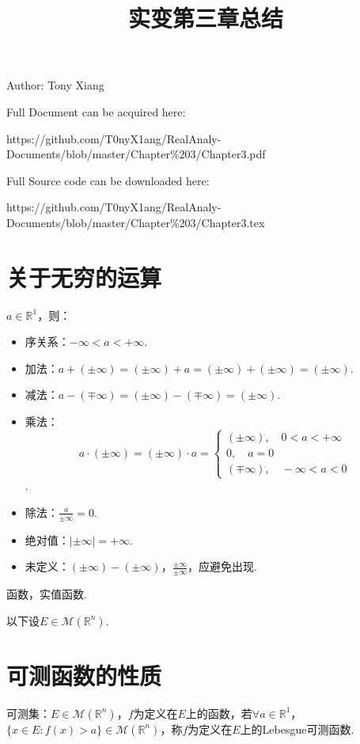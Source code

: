 \documentclass[bwprint, withoutpreface]{cumcmthesis}
\title{实变第三章总结}
\begin{document}
\maketitle
\noindent Author: Tony Xiang

\noindent Full Document can be acquired here: 

\noindent https://github.com/T0nyX1ang/RealAnaly-Documents/blob/master/Chapter\%203/Chapter3.pdf

\noindent Full Source code can be downloaded here:

\noindent https://github.com/T0nyX1ang/RealAnaly-Documents/blob/master/Chapter\%203/Chapter3.tex

\section{关于无穷的运算}
\indent $a \in \mathbb{R}^1$，则：
\begin{itemize}[itemindent=2em]
	\item 序关系：$-\infty < a < +\infty$.
	\item 加法：$a + (\pm{\infty}) = (\pm{\infty}) + a = (\pm{\infty}) + (\pm{\infty}) = (\pm{\infty})$.
	\item 减法：$a - (\mp{\infty}) = (\pm{\infty}) - (\mp{\infty}) = (\pm{\infty})$.
	\item 乘法：
	\begin{equation*}
	a \cdot (\pm{\infty}) = (\pm{\infty}) \cdot a = 
	\begin{cases}
		(\pm{\infty}), \quad 0 < a < +\infty \\
		0, \quad a = 0 \\
		(\mp{\infty}), \quad -\infty < a < 0
	\end{cases}	
	\end{equation*}.
	\item 除法：$\frac{a}{\pm{\infty}} = 0$.
	\item 绝对值：$|\pm{\infty}| = +\infty$.
	\item 未定义：$(\pm{\infty}) - (\pm{\infty})$，$\frac{\pm{\infty}}{\pm{\infty}}$，应避免出现.
\end{itemize}

函数，实值函数.

以下设$E \in \mathcal{M}(\mathbb{R}^n)$.

\section{可测函数的性质}
\indent 可测集：$E \in \mathcal{M}(\mathbb{R}^n)$，$f$为定义在$E$上的函数，若$\forall a \in \mathbb{R}^1$，$\{x \in E: f(x) > a\} \in \mathcal{M}(\mathbb{R}^n)$，称$f$为定义在$E$上的Lebesgue可测函数.
\end{document}
